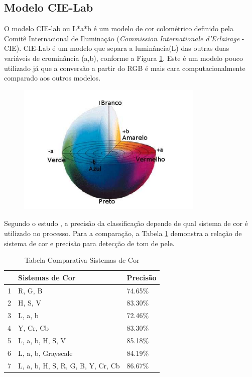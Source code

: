  \subsection{Modelo CIE-Lab} 
O modelo CIE-lab ou L*a*b é um modelo de cor colométrico definido pela Comitê Internacional de Iluminação (\textit{Commission Internationale d’Eclairage} - CIE). CIE-Lab é um modelo que separa a luminância(L) das outras duas variáveis de crominância (a,b), conforme a Figura \ref{fig: cielab}. Este é um modelo pouco utilizado já que a conversão a partir do RGB é mais cara computacionalmente \cite{Skin_detection_ashort_tutorial} comparado aos outros modelos.

\begin{figure}[h]
\caption{}
\centering

\includegraphics[]{Template_Latex_TCC-UNIFTEC/_lib/imagens/cielab.png}

\label{fig: cielab}
\end{figure}
 
Segundo o estudo \cite{Automatic_Skin_Tone_Extraction_for_Visagism_Applications},
a precisão da classificação depende de qual sistema de cor é utilizado no processo. Para a comparação, a Tabela \ref{table:Tabela_comparativa_sistemas_de_cores} demonstra a relação de sistema de cor e precisão para detecção de tom de pele.

\begin{table}[]
\centering
\caption{Tabela Comparativa Sistemas de Cor}
\label{table:Tabela_comparativa_sistemas_de_cores}\textbf{}
\begin{tabular}{lll}
\hline
  & Sistemas de Cor                   & Precisão \\ \hline
1 & R, G, B                           & 74.65\%  \\
2 & H, S, V                           & 83.30\%  \\
3 & L, a, b                           & 72.46\%  \\
4 & Y, Cr, Cb                         & 83.30\%  \\
5 & L, a, b, H, S, V                  & 85.18\%  \\
6 & L, a, b, Grayscale                & 84.19\%  \\
7 & L, a, b, H, S, R, G, B, Y, Cr, Cb & 86.67\%  \\ \hline
\end{tabular}%
\end{table}

